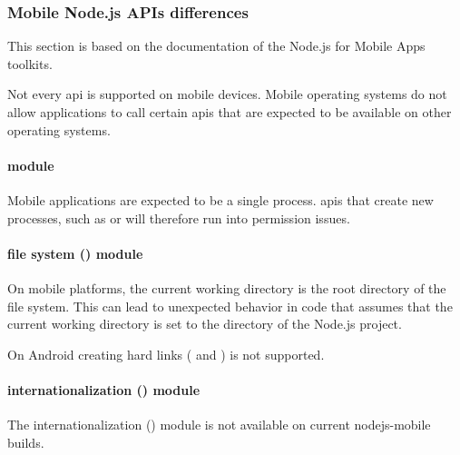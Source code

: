 
\subsubsection{Mobile Node.js APIs differences}
\label{sec:Capacitor-NodeJS:MobileAPIDifferences}

\begin{note}[Note]
  This section is based on the documentation of the Node.js for Mobile Apps toolkits. \cite{nodejs-mobile:docs}
\end{note}

Not every \ac{api} is supported on mobile devices. Mobile operating systems do not allow applications to call certain \acsp{api} that are expected to be available on other operating systems.

\paragraph{\protect{} module}

Mobile applications are expected to be a single process.
\acsp{api} that create new processes, such as  or  will therefore run into permission issues.

\paragraph{file system (\protect{}) module}

On mobile platforms, the current working directory is the root directory of the file system.
This can lead to unexpected behavior in code that assumes that the current working directory is set to the directory of the Node.js project.

On Android creating hard links ( and ) is not supported.

\paragraph{internationalization (\protect{}) module}

The internationalization () module is not available on current nodejs-mobile builds.

